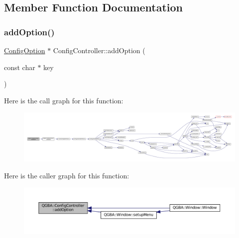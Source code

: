\subsection{Member Function Documentation}
\mbox{\label{class_q_g_b_a_1_1_config_controller_a2fead7b5d6810384e6779ab58af9101f}} 
\subsubsection{\texorpdfstring{add\+Option()}{addOption()}}
{\footnotesize\ttfamily \mbox{\hyperlink{class_q_g_b_a_1_1_config_option}{Config\+Option}} $\ast$ Config\+Controller\+::add\+Option (\begin{DoxyParamCaption}\item[{const char $\ast$}]{key }\end{DoxyParamCaption})}

Here is the call graph for this function\+:
\nopagebreak
\begin{figure}[H]
\begin{center}
\leavevmode
\includegraphics[width=350pt]{class_q_g_b_a_1_1_config_controller_a2fead7b5d6810384e6779ab58af9101f_cgraph}
\end{center}
\end{figure}
Here is the caller graph for this function\+:
\nopagebreak
\begin{figure}[H]
\begin{center}
\leavevmode
\includegraphics[width=350pt]{class_q_g_b_a_1_1_config_controller_a2fead7b5d6810384e6779ab58af9101f_icgraph}
\end{center}
\end{figure}
\mbox{\label{class_q_g_b_a_1_1_config_controller_a4f907fd63bc12690c053e57ef7e6c600}} 
